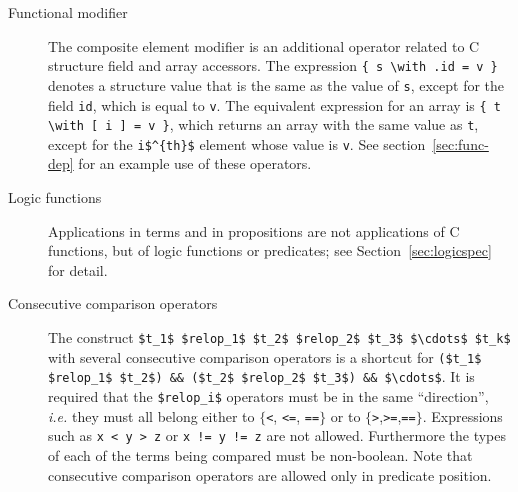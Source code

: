 \begin{description}
\item[Functional modifier]
  The composite element modifier is an additional
  operator related to C structure field and array accessors.
  The expression \lstinline|{ s \with .id = v }|
  denotes a structure value that is the same as the value of \lstinline|s|, except for the field
  \lstinline|id|, which is equal to \lstinline|v|.
  The equivalent expression for an array is
  \lstinline|{ t \with [ i ] = v }|,
  which returns an array with the same value as \lstinline|t|, except for the
  \lstinline|i$^{th}$| element whose value
  is \lstinline|v|.
  See section~\ref{sec:func-dep} for an example use of these operators.

\item[Logic functions] Applications in terms and in propositions are not
applications of C functions, but of logic functions or predicates; see
Section~\ref{sec:logicspec} for detail.

\item[Consecutive comparison operators]
  The construct
\lstinline|$t_1$ $relop_1$ $t_2$ $relop_2$ $t_3$ $\cdots$ $t_k$| with
  several consecutive comparison operators is a shortcut for
  \lstinline|($t_1$ $relop_1$ $t_2$) && ($t_2$ $relop_2$ $t_3$) && $\cdots$|.
  It is required that the \lstinline|$relop_i$| operators must be in
  the same ``direction'', \emph{i.e.} they must all belong either to
  $\{$\lstinline|<|, \lstinline|<=|, \lstinline|==|$\}$ or to
  $\{$\lstinline|>|,\lstinline|>=|,\lstinline|==|$\}$. Expressions such as
  \lstinline|x < y > z| or \lstinline|x != y != z| are not allowed.
  Furthermore the types of each of the terms being compared must be non-boolean.
  Note that consecutive comparison operators are allowed only
  in predicate position.

  \end{description}

